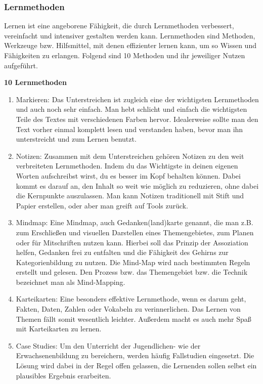 \subsubsection{Lernmethoden}

Lernen ist eine angeborene Fähigkeit, die durch Lernmethoden verbessert, vereinfacht und intensiver gestalten werden kann. Lernmethoden sind Methoden, Werkzeuge bzw. Hilfsmittel, mit denen effizienter lernen kann, um so Wissen und Fähigkeiten zu erlangen. Folgend sind 10 Methoden und ihr jeweiliger Nutzen aufgeführt.

{\bf 10 Lernmethoden}\\
\begin{enumerate}
	\item Markieren: Das Unterstreichen ist zugleich eine der wichtigsten Lernmethoden und auch noch sehr einfach. Man hebt schlicht und einfach die wichtigsten Teile des Textes mit verschiedenen Farben hervor. Idealerweise sollte man den Text vorher einmal komplett lesen und verstanden haben, bevor man ihn unterstreicht und zum Lernen benutzt.
	\item Notizen: Zusammen mit dem Unterstreichen gehören Notizen zu den weit verbreiteten Lernmethoden. Indem du das Wichtigste in deinen eigenen Worten aufschreibst wirst, du es besser im Kopf behalten können. Dabei kommt es darauf an, den Inhalt so weit wie möglich zu reduzieren, ohne dabei die Kernpunkte auszulassen.  Man kann Notizen traditionell mit Stift und Papier erstellen, oder aber man greift auf Tools zurück.
	\item Mindmap: Eine Mindmap, auch Gedanken(land)karte genannt, die man z.B. zum Erschließen und visuellen Darstellen eines Themengebietes, zum Planen oder für Mitschriften nutzen kann. Hierbei soll das Prinzip der Assoziation helfen, Gedanken frei zu entfalten und die Fähigkeit des Gehirns zur Kategorienbildung zu nutzen. Die Mind-Map wird nach bestimmten Regeln erstellt und gelesen. Den Prozess bzw. das Themengebiet bzw. die Technik bezeichnet man als Mind-Mapping.
	\item Karteikarten: Eine besonders effektive Lernmethode, wenn es darum geht, Fakten, Daten, Zahlen oder Vokabeln zu verinnerlichen. Das Lernen von Themen fällt somit wesentlich leichter. Außerdem macht es auch mehr Spaß mit Karteikarten zu lernen.
	\item Case Studies: Um den Unterricht der Jugendlichen- wie der Erwachsenenbildung zu bereichern, werden häufig Fallstudien eingesetzt. 
Die Lösung wird dabei in der Regel offen gelassen, die Lernenden sollen selbst ein plausibles Ergebnis erarbeiten. 

\end{enumerate}
